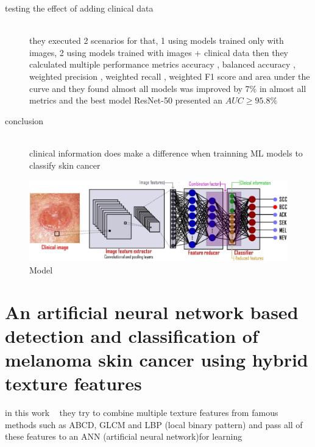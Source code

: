 \begin{description}
\item[testing the effect of adding clinical data] \hfill \\
    they executed 2 scenarios for that, 1 using models trained only with images, 2 using models trained with images + clinical data then they calculated multiple  performance metrics accuracy , balanced accuracy , weighted precision , weighted recall , weighted F1 score  and area under the curve and they found almost all models was improved by 7\% in almost all metrics and the best model ResNet-50 presented an $AUC \geq 95.8\%$ 

\item[conclusion] \hfill \\
    clinical information does make a difference when trainning ML models to classify skin cancer 
\end{description}



\begin{figure}[htbp]
\begin{center}
\includegraphics[width=15cm]{./chapter-03-state-of-the-art/clinical-image.png}
\end{center}
\caption{Model}
\label{fig:model}
\end{figure}






\section{An artificial neural network based detection and classification of melanoma skin cancer using hybrid texture features}

    in this work ~\cite{Tumpa2021} they try to combine multiple texture features from famous methods such as  ABCD, GLCM and LBP (local binary pattern) and pass all of these features to an ANN (artificial neural network)for learning

